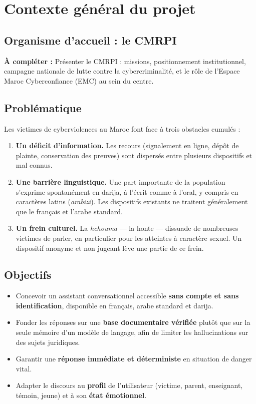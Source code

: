 \documentclass[a4paper,11pt,twoside]{report}
\newcommand{\todo}[1]{%
  \begin{tcolorbox}[colback=yellow!12,colframe=orange!70!black,left=4pt,right=4pt,top=3pt,bottom=3pt]
  \small\textbf{À compléter :} #1
  \end{tcolorbox}}
\begin{document}
\chapter{Contexte général du projet}
\label{chap:contexte}

\section{Organisme d'accueil : le CMRPI}

\todo{Présenter le CMRPI : missions, positionnement institutionnel, campagne
nationale de lutte contre la cybercriminalité, et le rôle de l'Espace Maroc
Cyberconfiance (EMC) au sein du centre.}

\section{Problématique}

Les victimes de cyberviolences au Maroc font face à trois obstacles cumulés :

\begin{enumerate}[itemsep=2pt]
  \item \textbf{Un déficit d'information.} Les recours (signalement en ligne,
  dépôt de plainte, conservation des preuves) sont dispersés entre plusieurs
  dispositifs et mal connus.
  \item \textbf{Une barrière linguistique.} Une part importante de la
  population s'exprime spontanément en darija, à l'écrit comme à l'oral, y
  compris en caractères latins (\emph{arabizi}). Les dispositifs existants ne
  traitent généralement que le français et l'arabe standard.
  \item \textbf{Un frein culturel.} La \emph{hchouma} — la honte — dissuade de
  nombreuses victimes de parler, en particulier pour les atteintes à caractère
  sexuel. Un dispositif anonyme et non jugeant lève une partie de ce frein.
\end{enumerate}

\section{Objectifs}

\begin{itemize}[itemsep=2pt]
  \item Concevoir un assistant conversationnel accessible \textbf{sans compte et
  sans identification}, disponible en français, arabe standard et darija.
  \item Fonder les réponses sur une \textbf{base documentaire vérifiée} plutôt
  que sur la seule mémoire d'un modèle de langage, afin de limiter les
  hallucinations sur des sujets juridiques.
  \item Garantir une \textbf{réponse immédiate et déterministe} en situation de
  danger vital.
  \item Adapter le discours au \textbf{profil} de l'utilisateur (victime,
  parent, enseignant, témoin, jeune) et à son \textbf{état émotionnel}.
\end{itemize}
\end{document}
